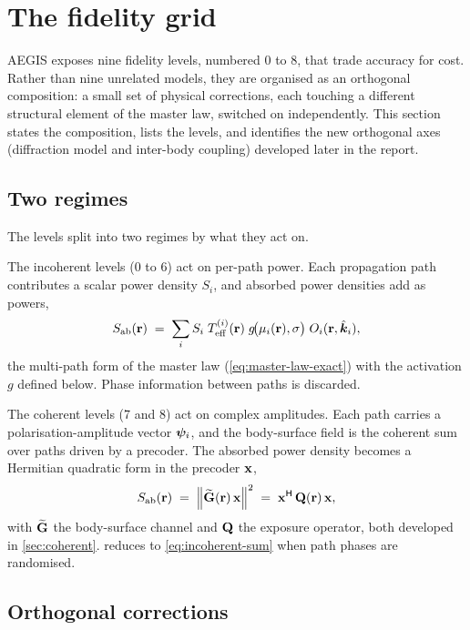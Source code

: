 \section{The fidelity grid}\label{sec:grid}

AEGIS exposes nine fidelity levels, numbered 0 to 8, that trade accuracy for
cost. Rather than nine unrelated models, they are organised as an orthogonal
composition: a small set of physical corrections, each touching a different
structural element of the master law, switched on independently. This section
states the composition, lists the levels, and identifies the new orthogonal
axes (diffraction model and inter-body coupling) developed later in the report.

\subsection{Two regimes}\label{sec:two-regimes}

The levels split into two regimes by what they act on.

The incoherent levels (0 to 6) act on per-path power. Each propagation path
contributes a scalar power density $S_i$, and absorbed power densities add as
powers,
\begin{equation}\label{eq:incoherent-sum}
  S_{\mathrm{ab}}(\mathbf{r}) \;=\; \sum_i S_i\;T_{\mathrm{eff}}^{(i)}(\mathbf{r})\;g\!\bigl(\mu_i(\mathbf{r}),\sigma\bigr)\;
  O_i(\mathbf{r},\hat{\bm{k}}_i),
\end{equation}
the multi-path form of the master law (\cref{eq:master-law-exact}) with the
activation $g$ defined below. Phase information between paths is discarded.

The coherent levels (7 and 8) act on complex amplitudes. Each path carries a
polarisation-amplitude vector $\bm{\psi}_i$, and the body-surface field is the
coherent sum over paths driven by a precoder. The absorbed power density becomes
a Hermitian quadratic form in the precoder $\mathbf{x}$,
\begin{equation}\label{eq:coherent-form}
  S_{\mathrm{ab}}(\mathbf{r}) \;=\; \norm{\widetilde{\mathbf{G}}(\mathbf{r})\,\mathbf{x}}^2
  \;=\; \mathbf{x}^{\mathsf{H}}\,\mathbf{Q}(\mathbf{r})\,\mathbf{x},
\end{equation}
with $\widetilde{\mathbf{G}}$ the body-surface channel and $\mathbf{Q}$ the exposure operator, both
developed in \cref{sec:coherent}.  reduces to
\cref{eq:incoherent-sum} when path phases are randomised.

\subsection{Orthogonal corrections}\label{sec:orthogonal}

